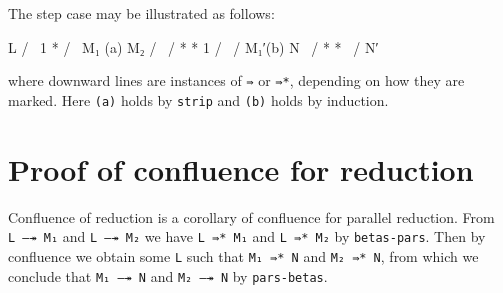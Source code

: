 The step case may be illustrated as follows:

\begin{myDisplay}
        L
       / \
      1   *
     /     \
    M₁ (a)  M₂
   / \     /
  *   *   1
 /     \ /
M₁′(b)  N
 \     /
  *   *
   \ /
    N′
\end{myDisplay}

where downward lines are instances of \texttt{⇛} or \texttt{⇛*},
depending on how they are marked. Here \texttt{(a)} holds by
\texttt{strip} and \texttt{(b)} holds by induction.

\hypertarget{proof-of-confluence-for-reduction}{%
\section{Proof of confluence for
reduction}\label{proof-of-confluence-for-reduction}}

Confluence of reduction is a corollary of confluence for parallel
reduction. From \texttt{L\ —↠\ M₁} and \texttt{L\ —↠\ M₂} we have
\texttt{L\ ⇛*\ M₁} and \texttt{L\ ⇛*\ M₂} by \texttt{betas-pars}. Then
by confluence we obtain some \texttt{L} such that \texttt{M₁\ ⇛*\ N} and
\texttt{M₂\ ⇛*\ N}, from which we conclude that \texttt{M₁\ —↠\ N} and
\texttt{M₂\ —↠\ N} by \texttt{pars-betas}.

